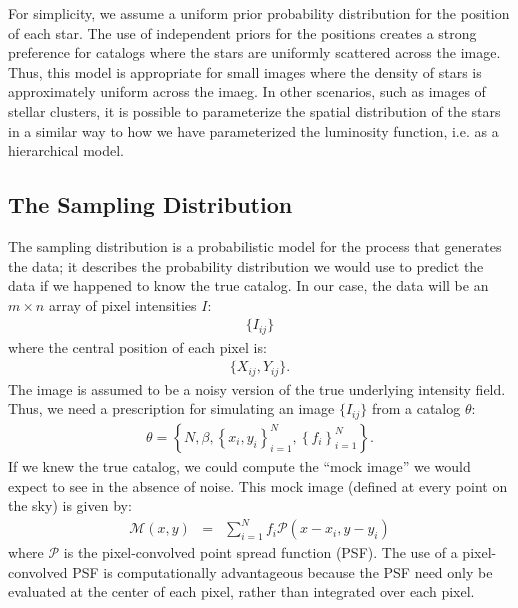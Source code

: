 \documentclass[12pt, preprint]{aastex}
\begin{document}
For simplicity, we assume a uniform prior probability distribution for the
position of each star. The use of independent priors for the positions creates
a strong preference for catalogs where
the stars are uniformly scattered across the image. Thus, this model is
appropriate for small images where the density of stars is approximately
uniform across the imaeg. In other scenarios, such as images of stellar clusters, it is possible
to parameterize the spatial distribution of the stars in a similar way to how
we have parameterized the luminosity function, i.e. as a hierarchical model.

\subsection{The Sampling Distribution}
The sampling distribution is a probabilistic model for the process that
generates the data; it describes the probability distribution we would use
to predict the data if we happened to know the true catalog. In our case,
the data will be an $m \times n$ array of pixel intensities $I$:
\begin{eqnarray}
\{I_{ij}\}
\end{eqnarray}
where the central position of each pixel is:
\begin{eqnarray}
\{X_{ij}, Y_{ij}\}.
\end{eqnarray}
The image is assumed to be a noisy version of the true underlying intensity
field. Thus, we need
a prescription for simulating an image $\{I_{ij}\}$ from a catalog $\theta$:
\begin{eqnarray}
\theta = \left\{N, \beta, \left\{x_i, y_i\right\}_{i=1}^N,
\left\{f_i\right\}_{i=1}^N\right\}.
\end{eqnarray}
If we knew the true catalog, we could compute the
``mock image'' we would expect to see
in the absence of noise. This mock image (defined at every point on the sky)
is given by:
\begin{eqnarray}
\mathcal{M}(x, y) &=& \sum_{i=1}^N f_i \mathcal{P}(x - x_i, y - y_i)
\end{eqnarray}
where $\mathcal{P}$ is the pixel-convolved point spread function (PSF). The use
of a pixel-convolved PSF is computationally advantageous because the PSF need
only be evaluated at the center of each pixel, rather than integrated over each
pixel.
\end{document}
